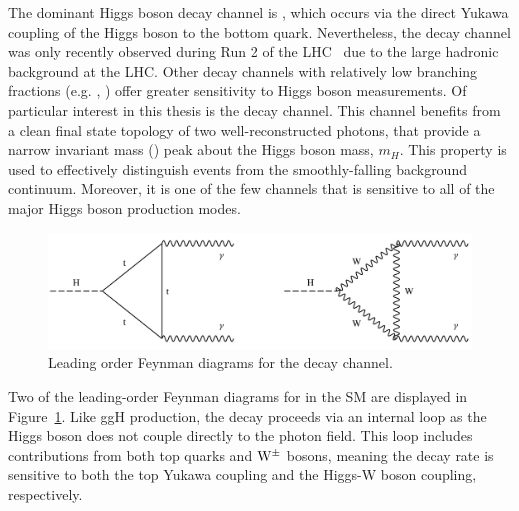 The dominant Higgs boson decay channel is \Hbb, which occurs via the direct Yukawa coupling of the Higgs boson to the bottom quark. Nevertheless, the \Hbb decay channel was only recently observed during Run 2 of the LHC~\cite{Aaboud:2018zhk,Sirunyan:2018kst} due to the large hadronic background at the LHC. Other decay channels with relatively low branching fractions (e.g. \Hfl, \Hgg) offer greater sensitivity to Higgs boson measurements. Of particular interest in this thesis is the \Hgg decay channel. This channel benefits from a clean final state topology of two well-reconstructed photons, that provide a narrow invariant mass (\mgg) peak about the Higgs boson mass, $m_H$. This property is used to effectively distinguish \Hgg events from the smoothly-falling background continuum. Moreover, it is one of the few channels that is sensitive to all of the major Higgs boson production modes.

\begin{figure}[htb!]
  \centering
  \includegraphics[width=.8\linewidth]{Figures/theory/hgg_decay_feynman.png}
  \caption[Leading order Feynman diagrams for the \Hgg decay channel]
  {
    Leading order Feynman diagrams for the \Hgg decay channel.
  }
  \label{fig:hgg_decay}
\end{figure}

Two of the leading-order Feynman diagrams for \Hgg in the SM are displayed in Figure~\ref{fig:hgg_decay}. Like ggH production, the \Hgg decay proceeds via an internal loop as the Higgs boson does not couple directly to the photon field. This loop includes contributions from both top quarks and ${\rm{W}}^{\pm}$ bosons, meaning the \Hgg decay rate is sensitive to both the top Yukawa coupling and the Higgs-W boson coupling, respectively.

